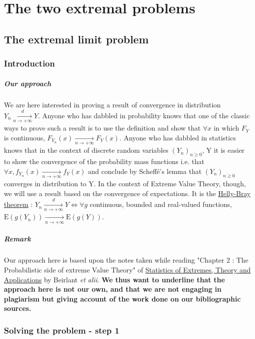 \chapter{The two extremal problems}
 \section{The extremal limit problem}
 \subsection{Introduction}
\paragraph{Our approach} We are here interested in proving a result of convergence in distribution $Y_n \xrightarrow[n \rightarrow + \infty]{d} Y$. Anyone who has dabbled in probability knows that one of the classic ways to prove such a result is to use the definition and show that $\forall x$ in which $F_Y$ is continuous, $F_{Y_n}(x) \xrightarrow[n \rightarrow + \infty]{} F_Y(x)$. Anyone who has dabbled in statistics knows that in the context of discrete random variables $(Y_n)_{n \ge 0}$, Y it is easier to show the convergence of the probability mass functions i.e. that $\forall x, f_{Y_n}(x) \xrightarrow[n \rightarrow + \infty]{} f_Y(x)$ and conclude by Scheffé's lemma that $(Y_n)_{n \ge 0}$ converges in distribution to Y. In the context of Extreme Value Theory, though, we will use a result based on the convergence of expectations. It is the \underline{Helly-Bray theorem} : \newline $Y_n \xrightarrow[n \rightarrow + \infty]{d} Y \iff \forall g$ continuous, bounded and real-valued functions, $\mathrm{E}(g(Y_n)) \xrightarrow[n \rightarrow + \infty]{} \mathrm{E}(g(Y))$.
\paragraph{Remark} Our approach here is based upon the notes taken while reading "Chapter 2 : The Probabilistic side of extreme Value Theory" of \underline{Statistics of Extremes, Theory and Applications} by Beirlant \textit{et alii}. \textbf{We thus want to underline that the approach here is not our own, and that we are not engaging in plagiarism but giving account of the work done on our bibliographic sources.} 
\subsection{Solving the problem - step 1}
